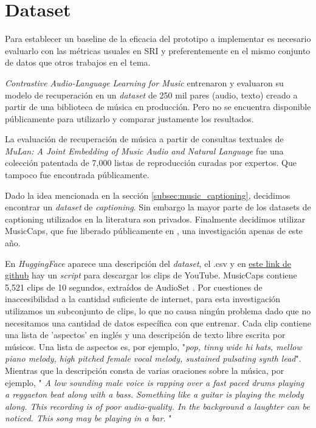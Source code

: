 \section{Dataset}
\label{sec:dataset}

Para establecer un baseline de la eficacia del prototipo a implementar es necesario evaluarlo con las métricas usuales en SRI y preferentemente en el mismo conjunto de datos que otros trabajos en el tema. 

\textit{Contrastive Audio-Language Learning for Music} \cite{Manco2022ContrastiveAL} entrenaron y evaluaron su modelo de recuperación en un \textit{dataset} de 250 mil pares (audio, texto) creado a partir de una biblioteca de música en producción. Pero no se encuentra disponible públicamente para utilizarlo y comparar justamente los resultados.

La evaluación de recuperación de música a partir de consultas textuales de \textit{MuLan: A Joint Embedding of Music Audio and Natural Language} \cite{Huang2022MuLanAJ} fue una colección patentada de 7,000 listas de reproducción curadas por expertos. Que tampoco fue encontrada públicamente.

Dado la idea mencionada en la sección \ref{subsec:music_captioning}, decidimos encontrar un \textit{dataset} de \textit{captioning}. Sin embargo la mayor parte de los datasets de captioning utilizados en la literatura son privados. Finalmente decidimos utilizar MusicCaps, que fue liberado públicamente en \cite{Agostinelli2023MusicLMGM}, una investigación apenas de este año. 

En \textit{HuggingFace} \cite{huggFaceMusicCaps} aparece una descripción del \textit{dataset}, el .csv y en \href{https://github.com/nateraw/download-musiccaps-dataset}{este link de github} hay un \textit{script} para descargar los clips de YouTube. MusicCaps contiene 5,521 clips de 10 segundos, extraídos de AudioSet \cite{Gemmeke2017AudioSA}. Por cuestiones de inaccesibilidad a la cantidad suficiente de internet, para esta investigación utilizamos un subconjunto de clips, lo que no causa ningún problema dado que no necesitamos una cantidad de datos específica con que entrenar. Cada clip contiene una lista de 'aspectos' en inglés y una descripción de texto libre escrita por músicos. Una lista de aspectos es, por ejemplo, "\textit{pop, tinny wide hi hats, mellow piano melody, high pitched female vocal melody, sustained pulsating synth lead}". Mientras que la descripción consta de varias oraciones sobre la música, por ejemplo, " \textit{A low sounding male voice is rapping over a fast paced drums playing a reggaeton beat along with a bass. Something like a guitar is playing the melody along. This recording is of poor audio-quality. In the background a laughter can be noticed. This song may be playing in a bar.} "

